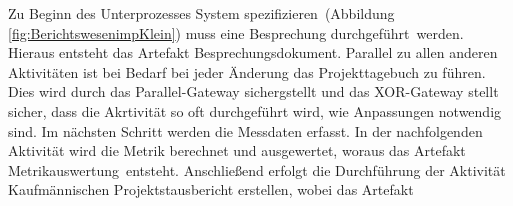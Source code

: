 Zu Beginn des Unterprozesses \grqq System spezifizieren\grqq \  (Abbildung \ref{fig:BerichtswesenimpKlein}) muss eine \grqq Besprechung durchgeführt\grqq \  werden. Hieraus entsteht das Artefakt \grqq Besprechungsdokument\grqq.\newline
Parallel zu allen anderen Aktivitäten ist bei Bedarf bei jeder Änderung das \grqq Projekttagebuch zu führen\grqq. Dies wird durch das Parallel-Gateway sichergstellt und das XOR-Gateway stellt sicher, dass die Akrtivität so oft durchgeführt wird, wie Anpassungen notwendig sind. \newline
Im nächsten Schritt werden die \grqq Messdaten erfasst\grqq.
In der nachfolgenden Aktivität wird die \grqq Metrik berechnet und ausgewertet\grqq, woraus das Artefakt \grqq Metrikauswertung\grqq \  entsteht.
Anschließend erfolgt die Durchführung der Aktivität \grqq Kaufmännischen Projektstausbericht erstellen\grqq, wobei das Artefakt 
